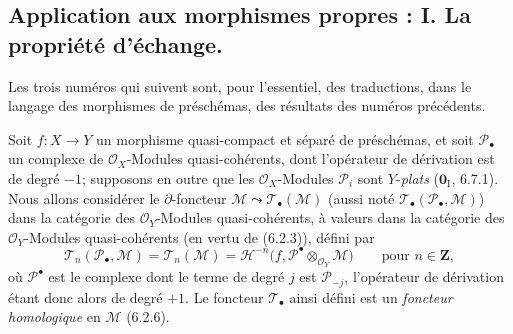 \subsection{Application aux morphismes propres : I. La propriété d'échange.}
\label{subsection:III.7.7.fr}

Les trois numéros qui suivent sont, pour l'essentiel, des traductions, dans le
langage des morphismes de préschémas, des résultats des numéros précédents.

\begin{env}[7.7.1]
Soit $f:X\to Y$ un morphisme quasi-compact et séparé de préschémas, et soit
$\mathscr P_\bullet$ un complexe de $\mathscr O_X$-Modules quasi-cohérents, dont
l'opérateur de dérivation est de degré $-1$; supposons en outre que les
$\mathscr O_X$-Modules $\mathscr P_i$ sont $Y$-\emph{plats} ($\mathbf{0}_{\mathrm I}$, 6.7.1).
Nous allons considérer le $\partial$-foncteur
$\mathscr M\leadsto\mathscr T_\bullet(\mathscr M)$ (aussi noté
$\mathscr T_\bullet(\mathscr P_\bullet,\mathscr M)$) dans la catégorie des
$\mathscr O_Y$-Modules quasi-cohérents, à valeurs dans la catégorie des
$\mathscr O_Y$-Modules quasi-cohérents (en vertu de (6.2.3)), défini par
\[
  \mathscr T_n(\mathscr P_\bullet,\mathscr M)
  =\mathscr T_n(\mathscr M)
  =\mathscr H^{-n}
    \bigl(f,\mathscr P^\bullet\otimes_{\mathscr O_Y}\mathscr M\bigr)
  \qquad\text{pour }n\in\mathbf Z,
  \tag{7.7.1.1}\label{III.7.7.1.1.fr}
\]
où $\mathscr P^\bullet$ est le complexe dont le terme de degré $j$ est
$\mathscr P_{-j}$, l'opérateur de dérivation étant donc alors de degré $+1$. Le foncteur
$\mathscr T_\bullet$ ainsi défini est un \emph{foncteur homologique} en
$\mathscr M$ (6.2.6).
\end{env}


